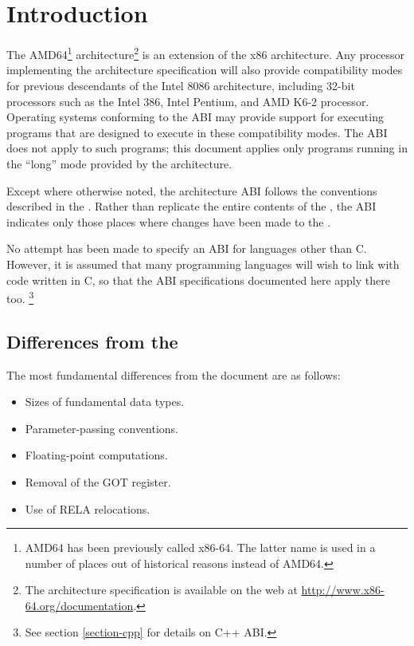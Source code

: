 \chapter{Introduction}

The AMD64\footnote{AMD64 has been previously called x86-64.  The
  latter name is used in a number of places out of historical reasons
  instead of AMD64.}  architecture\footnote{The architecture
  specification is available on the web at
  \url{http://www.x86-64.org/documentation}.} is an extension of the
x86 architecture.  Any processor implementing the \xARCH architecture
specification will also provide compatibility modes for previous
descendants of the Intel 8086 architecture, including 32-bit
processors such as the Intel 386, Intel Pentium, and AMD K6-2
processor.  Operating systems conforming to the \xARCH ABI may provide
support for executing programs that are designed to execute in these
compatibility modes.  The \xARCH ABI does not apply to such programs;
this document applies only programs running in the ``long'' mode
provided by the \xARCH architecture.

Except where otherwise noted, the \xARCH architecture ABI follows the
conventions described in the \intelabi.  Rather than replicate the
entire contents of the \intelabi, the \xARCH ABI indicates only those
places where changes have been made to the \intelabi.

No attempt has been made to specify an ABI for languages other than C.
However, it is assumed that many programming languages will wish to
link with code written in C, so
that the ABI specifications documented here apply there too.%
\footnote{See section \ref{section-cpp} for details on C++ ABI.}

\section{Differences from the \intelabi}

The most fundamental differences from the \intelabi document
are as follows:
\begin{itemize}
\item Sizes of fundamental data types.
\item Parameter-passing conventions.
\item Floating-point computations.
\item Removal of the GOT register.
\item Use of RELA relocations.
\end{itemize}

